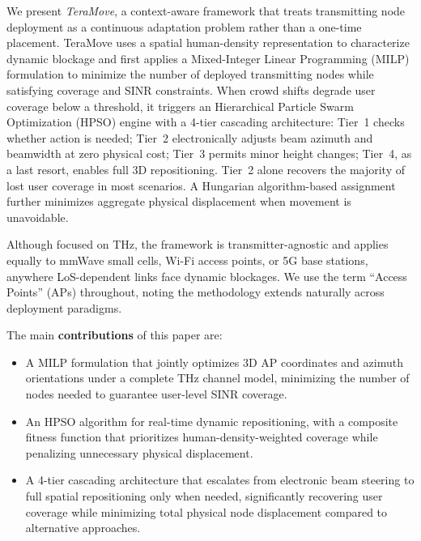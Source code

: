 \documentclass[conference]{IEEEtran}
\begin{document}
We present \textit{TeraMove}, a context-aware framework that treats transmitting node deployment as a continuous adaptation problem rather than a one-time placement. TeraMove uses a spatial human-density representation to characterize dynamic blockage and first applies a Mixed-Integer Linear Programming (MILP) formulation to minimize the number of deployed transmitting nodes while satisfying coverage and SINR constraints. When crowd shifts degrade user coverage below a threshold, it triggers an Hierarchical Particle Swarm Optimization (HPSO) engine with a 4-tier cascading architecture: Tier~1 checks whether action is needed; Tier~2 electronically adjusts beam azimuth and beamwidth at zero physical cost; Tier~3 permits minor height changes; Tier~4, as a last resort, enables full 3D repositioning. Tier~2 alone recovers the majority of lost user coverage in most scenarios. A Hungarian algorithm-based assignment further minimizes aggregate physical displacement when movement is unavoidable.

Although focused on THz, the framework is transmitter-agnostic and applies equally to mmWave small cells, Wi-Fi access points, or 5G base stations, anywhere LoS-dependent links face dynamic blockages. We use the term ``Access Points'' (APs) throughout, noting the methodology extends naturally across deployment paradigms.

The main \textbf{contributions} of this paper are:
\begin{itemize}
    \item A MILP formulation that jointly optimizes 3D AP coordinates and azimuth orientations under a complete THz channel model, minimizing the number of nodes needed to guarantee user-level SINR coverage.

    \item An HPSO algorithm for real-time dynamic repositioning, with a composite fitness function that prioritizes human-density-weighted coverage while penalizing unnecessary physical displacement.

    \item A 4-tier cascading architecture that escalates from electronic beam steering to full spatial repositioning only when needed, significantly recovering user coverage while minimizing total physical node displacement compared to alternative approaches.
\end{itemize}


\end{document}
